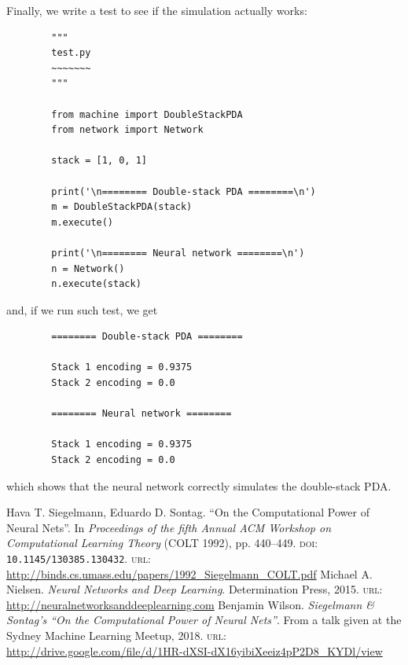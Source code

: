 \documentclass{book}
\theoremstyle{definition}
\theoremstyle{plain}
\theoremstyle{plain}
\theoremstyle{remark}
\theoremstyle{plain}
\begin{document}
	Finally, we write a test to see if the simulation actually works:
	\begin{verbatim}
		"""
		test.py
		~~~~~~~
		"""
		
		from machine import DoubleStackPDA
		from network import Network
		
		stack = [1, 0, 1]
		
		print('\n======== Double-stack PDA ========\n')
		m = DoubleStackPDA(stack)
		m.execute()
		
		print('\n======== Neural network ========\n')
		n = Network()
		n.execute(stack)
	\end{verbatim}
	and, if we run such test, we get	
	\begin{verbatim}
		======== Double-stack PDA ========
		
		Stack 1 encoding = 0.9375
		Stack 2 encoding = 0.0
		
		======== Neural network ========
		
		Stack 1 encoding = 0.9375
		Stack 2 encoding = 0.0
	\end{verbatim}
	which shows that the neural network correctly simulates the double-stack PDA.
	
	\begin{thebibliography}{9}
			Hava T. Siegelmann, Eduardo D. Sontag.
			\textquotedblleft On the Computational Power of Neural Nets\textquotedblright.
			In \textit{Proceedings of the fifth Annual ACM Workshop on Computational Learning Theory} (COLT 1992), pp. 440--449.
			\textsc{doi}: \texttt{10.1145/130385.130432}. 
			\textsc{url}: \url{http://binds.cs.umass.edu/papers/1992_Siegelmann_COLT.pdf}
			Michael A. Nielsen. 
			\textit{Neural Networks and Deep Learning}. 
			Determination Press, 2015.
			\textsc{url}: \url{http://neuralnetworksanddeeplearning.com}
			Benjamin Wilson.
			\textit{Siegelmann \& Sontag's \textquotedblleft On the Computational Power of Neural Nets\textquotedblright}.
			 From a talk given at the Sydney Machine Learning Meetup, 2018. 
			 \textsc{url}: \url{http://drive.google.com/file/d/1HR-dXSI-dX16yibiXeeiz4pP2D8_KYDl/view}
	\end{thebibliography}
	
\end{document}
